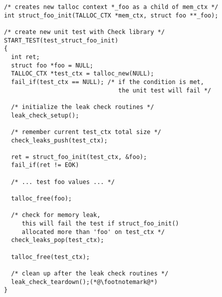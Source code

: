 \begin{lstlisting}[caption={Martin Nagy's leak check routines},
morekeywords={leak_check_setup,check_leaks_push,
              check_leaks_pop,leak_check_teardown}]
/* creates new talloc context *_foo as a child of mem_ctx */
int struct_foo_init(TALLOC_CTX *mem_ctx, struct foo **_foo);

/* create new unit test with Check library */
START_TEST(test_struct_foo_init)
{
  int ret;
  struct foo *foo = NULL;
  TALLOC_CTX *test_ctx = talloc_new(NULL);
  fail_if(test_ctx == NULL); /* if the condition is met,
                                the unit test will fail */
  
  /* initialize the leak check routines */
  leak_check_setup();
  
  /* remember current test_ctx total size */
  check_leaks_push(test_ctx);
  
  ret = struct_foo_init(test_ctx, &foo);
  fail_if(ret != EOK)
  
  /* ... test foo values ... */
  
  talloc_free(foo);
  
  /* check for memory leak,
     this will fail the test if struct_foo_init()
     allocated more than 'foo' on test_ctx */
  check_leaks_pop(test_ctx);
  
  talloc_free(test_ctx);
  
  /* clean up after the leak check routines */
  leak_check_teardown();(*@\footnotemark@*)
}
\end{lstlisting}

% 
%     
% 
% 

\label{talloc:sec:debugging}